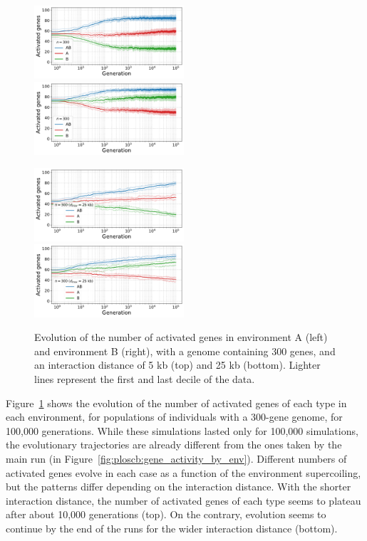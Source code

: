 \begin{figure}[H]
\centering
\includegraphics[width=0.495\textwidth]{param/300-genes/interaction-5k/gene_activity_env_A.pdf}
\includegraphics[width=0.495\textwidth]{param/300-genes/interaction-5k/gene_activity_env_B.pdf}

\includegraphics[width=0.495\textwidth]{param/300-genes/interaction-25k/gene_activity_env_A.pdf}
\includegraphics[width=0.495\textwidth]{param/300-genes/interaction-25k/gene_activity_env_B.pdf}
\caption[Evolution of the number of activated genes in each environment, with a 300-gene genome]{Evolution of the number of activated genes in environment A (left) and environment B (right), with a genome containing 300 genes, and an interaction distance of 5 kb (top) and 25 kb (bottom).
Lighter lines represent the first and last decile of the data.}
\label{fig:param:300genes-activ-by-env}
\end{figure}

Figure~\ref{fig:param:300genes-activ-by-env} shows the evolution of the number of activated genes of each type in each environment, for populations of individuals with a 300-gene genome, for 100,000 generations.
While these simulations lasted only for 100,000 simulations, the evolutionary trajectories are already different from the ones taken by the main run (in Figure~\ref{fig:ploscb:gene_activity_by_env}).
Different numbers of activated genes evolve in each case as a function of the environment supercoiling, but the patterns differ depending on the interaction distance.
With the shorter interaction distance, the number of activated genes of each type seems to plateau after about 10,000 generations (top).
On the contrary, evolution seems to continue by the end of the runs for the wider interaction distance (bottom).

